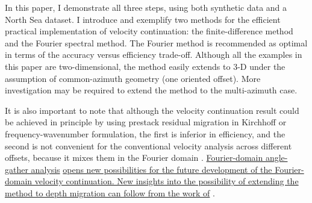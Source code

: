 In this paper, I demonstrate all three steps, using both synthetic data and a
North Sea dataset. I introduce and exemplify two methods for the efficient
practical implementation of velocity continuation: the finite-difference
method and the Fourier spectral method. The Fourier method is recommended as
optimal in terms of the accuracy versus efficiency trade-off. Although all the
examples in this paper are two-dimensional, the method easily extends to 3-D
under the assumption of common-azimuth geometry (one oriented offset). More
investigation may be required to extend the method to the multi-azimuth case.

It is also important to note that although the velocity continuation result
could be achieved in principle by using prestack residual migration in
Kirchhoff \cite{Etgen.sepphd.68} or frequency-wavenumber
\cite{GEO61-02-06050607} formulation, the first is inferior in efficiency, and
the second is not convenient for the conventional velocity analysis across
different offsets, because it mixes them in the Fourier domain
\cite{SEG-2000-09920995}.  \uline{Fourier-domain angle-gather analysis}
\cite{SEG-2001-02960299,sandf} \uline{opens new possibilities for the future
development of the Fourier-domain velocity continuation. New insights into the
possibility of extending the method to depth migration can follow from the
work of} .

